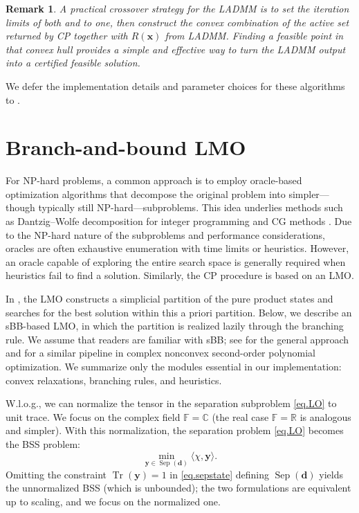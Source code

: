 \documentclass[smallextended]{svjour3}
\newtheorem{remark}{Remark}
\newcommand{\R}{\mathbb R}
\newcommand{\F}{\mathbb F}
\newcommand{\C}{\mathbb C}
\DeclareMathOperator{\sep}{Sep}
\newcommand{\1}{\mathbf{1}}
\newcommand{\x}{\mathbf{x}}
\newcommand{\y}{\mathbf{y}}
\newcommand{\NPh}{\textsf{NP}-hard}
\DeclareMathOperator{\tr}{Tr}
\newcommand{\inner}[2]{\langle #1, #2 \rangle}
\newcommand{\vc}[1]{\mathbf{#1}}
\newcommand{\vd}{\vc{d}}
\begin{document}
\begin{remark}
    \label{rmk.crossover}
A practical crossover strategy for the LADMM is to set the iteration limits of both  and  to one, then construct the convex combination of the active set returned by CP together with $R(\x)$ from LADMM. Finding a feasible point in that convex hull provides a simple and effective way to turn the LADMM output into a certified feasible solution.
\end{remark}

We defer the implementation details and parameter choices for these algorithms to .


\section{Branch-and-bound LMO}

\label{sec.sbb}

For \NPh{} problems, a common approach is to employ oracle-based optimization algorithms that decompose the original problem into simpler—though typically still \NPh{}—subproblems. This idea underlies methods such as Dantzig–Wolfe decomposition for integer programming \cite{Vanderbeck2010} and CG methods \cite{cgbook}. Due to the \NPh{} nature of the subproblems and performance considerations, oracles are often exhaustive enumeration with time limits or heuristics. However, an oracle capable of exploring the entire search space is generally required when heuristics fail to find a solution. Similarly, the CP procedure  is based on an LMO.

In \cite{liu2025unified}, the LMO constructs a simplicial partition of the pure product states and searches for the best solution within this a priori partition. Below, we describe an sBB-based LMO, in which the partition is realized lazily through the branching rule. We assume that readers are familiar with sBB; see \cite{belotti2009branching} for the general approach and \cite{chen2017spatial} for a similar pipeline in complex nonconvex second-order polynomial optimization. We summarize only the modules essential in our implementation: convex relaxations, branching rules, and heuristics.

W.l.o.g., we can normalize the tensor in the separation subproblem \eqref{eq.LO} to unit trace. We focus on the complex field $\F=\C$ (the real case $\F=\R$ is analogous and simpler). With this normalization, the separation problem \eqref{eq.LO} becomes the BSS problem:
\begin{equation}
    \label{eq.sep} \tag{BSS}
        \min_{\y \in \sep(\vd)}\inner{\chi}{\y}.
\end{equation}
Omitting the constraint $\tr(\y)=1$ in \eqref{eq.sepstate}  defining $\sep(\vd)$ yields the unnormalized BSS (which is unbounded); the two formulations are equivalent up to scaling, and we focus on the normalized one.
\end{document}
